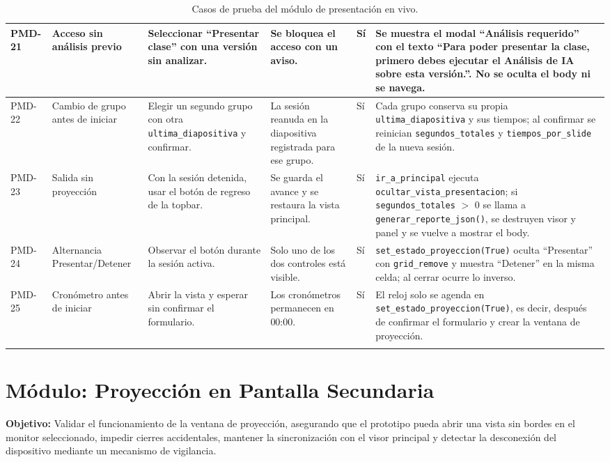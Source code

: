 \documentclass[12pt,letterpaper]{article}
\begin{document}
{\begin{longtable}{|L{1.1cm}|L{2.3cm}|L{3.2cm}|L{3.6cm}|L{1.2cm}|L{3.6cm}|}
PMD-21 & Acceso sin análisis previo & Seleccionar ``Presentar clase'' con una versión sin analizar. & Se bloquea el acceso con un aviso. & Sí & Se muestra el modal ``Análisis requerido'' con el texto ``Para poder presentar la clase, primero debes ejecutar el Análisis de IA sobre esta versión.''. No se oculta el body ni se navega. \\ \hline
PMD-22 & Cambio de grupo antes de iniciar & Elegir un segundo grupo con otra \texttt{ultima\_diapositiva} y confirmar. & La sesión reanuda en la diapositiva registrada para ese grupo. & Sí & Cada grupo conserva su propia \texttt{ultima\_diapositiva} y sus tiempos; al confirmar se reinician \texttt{segundos\_totales} y \texttt{tiempos\_por\_slide} de la nueva sesión. \\ \hline
PMD-23 & Salida sin proyección & Con la sesión detenida, usar el botón de regreso de la topbar. & Se guarda el avance y se restaura la vista principal. & Sí & \texttt{ir\_a\_principal} ejecuta \texttt{ocultar\_vista\_presentacion}; si \texttt{segundos\_totales} $>$ 0 se llama a \texttt{generar\_reporte\_json()}, se destruyen visor y panel y se vuelve a mostrar el body. \\ \hline
PMD-24 & Alternancia Presentar/Detener & Observar el botón durante la sesión activa. & Solo uno de los dos controles está visible. & Sí & \texttt{set\_estado\_proyeccion(True)} oculta ``Presentar'' con \texttt{grid\_remove} y muestra ``Detener'' en la misma celda; al cerrar ocurre lo inverso. \\ \hline
PMD-25 & Cronómetro antes de iniciar & Abrir la vista y esperar sin confirmar el formulario. & Los cronómetros permanecen en 00:00. & Sí & El reloj solo se agenda en \texttt{set\_estado\_proyeccion(True)}, es decir, después de confirmar el formulario y crear la ventana de proyección. \\ \hline
\caption{Casos de prueba del módulo de presentación en vivo.}
\label{tab:casos-prueba-modulo-presentacion}
\end{longtable}
}

\clearpage
\section*{Módulo: Proyección en Pantalla Secundaria}

\textbf{Objetivo:} Validar el funcionamiento de la ventana de proyección, asegurando que el prototipo pueda abrir una vista sin bordes en el monitor seleccionado, impedir cierres accidentales, mantener la sincronización con el visor principal y detectar la desconexión del dispositivo mediante un mecanismo de vigilancia.
\end{document}
